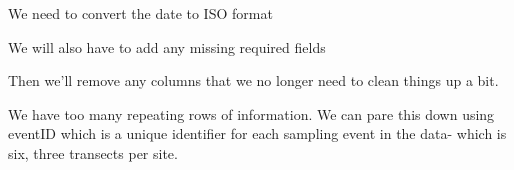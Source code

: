 \documentclass[
]{book}
\newenvironment{Shaded}{\begin{snugshade}}{\end{snugshade}}
\newcommand{\AttributeTok}[1]{\textcolor[rgb]{0.77,0.63,0.00}{#1}}
\newcommand{\ConstantTok}[1]{\textcolor[rgb]{0.00,0.00,0.00}{#1}}
\newcommand{\FunctionTok}[1]{\textcolor[rgb]{0.00,0.00,0.00}{#1}}
\newcommand{\NormalTok}[1]{#1}
\newcommand{\OtherTok}[1]{\textcolor[rgb]{0.56,0.35,0.01}{#1}}
\newcommand{\SpecialCharTok}[1]{\textcolor[rgb]{0.00,0.00,0.00}{#1}}
\newcommand{\StringTok}[1]{\textcolor[rgb]{0.31,0.60,0.02}{#1}}
\begin{document}
We need to convert the date to ISO format

\begin{Shaded}
\end{Shaded}

We will also have to add any missing required fields

\begin{Shaded}
\end{Shaded}

Then we'll remove any columns that we no longer need to clean things up a bit.

\begin{Shaded}
\end{Shaded}

We have too many repeating rows of information. We can pare this down using eventID which
is a unique identifier for each sampling event in the data- which is six, three transects
per site.
\end{document}
